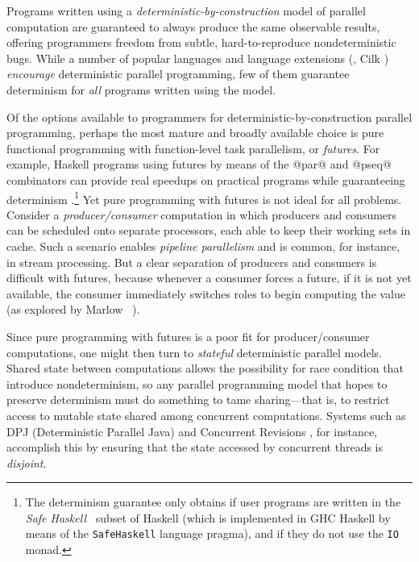 Programs written using a \emph{deterministic-by-construction} model of
parallel computation are guaranteed to always produce the same
observable results, offering programmers freedom from subtle,
hard-to-reproduce nondeterministic bugs.  While a number of popular
languages and language extensions (\eg, Cilk \cite{cilk}) \emph{encourage} deterministic parallel programming, few
of them guarantee determinism for \emph{all} programs written using
the model.

Of the options available to programmers for
deterministic-by-construction parallel programming, perhaps the most
mature and broadly available choice is pure functional programming
with function-level task parallelism, or \emph{futures}.  For example,
Haskell programs using futures by means of the @par@ and @pseq@
combinators can provide real speedups on practical programs while
guaranteeing determinism \cite{marlow-par}.\footnote{The determinism
  guarantee only obtains if user programs are written in the
  \emph{Safe Haskell}~\cite{safe-haskell} subset of Haskell (which is
  implemented in GHC Haskell by means of the \lstinline|SafeHaskell|
  language pragma), and if they do not use the \lstinline|IO| monad.}
Yet pure programming with futures is not ideal for all problems.
Consider a \emph{producer/consumer} computation in which producers and
consumers can be scheduled onto separate processors, each able to keep
their working sets in cache.  Such a scenario enables \emph{pipeline
  parallelism} and is common, for instance, in stream processing.  But
a clear separation of producers and consumers is difficult with
futures, because whenever a consumer forces a future, if it is not yet
available, the consumer immediately switches roles to begin computing
the value (as explored by Marlow \etal~\cite{monad-par}).

Since pure programming with futures is a poor fit for
producer/consumer computations, one might then turn to
{\em stateful} deterministic parallel models.  Shared state between
computations allows the possibility for race condition that introduce
nondeterminism, so any parallel programming model that hopes to preserve
determinism must do something to tame sharing---that is, to restrict
access to mutable state shared among concurrent computations.  Systems
such as DPJ (Deterministic Parallel Java) \cite{dpj-hotpar09} and
Concurrent Revisions
\cite{concurrent-revisions-oopsla,concurrent-revisions-haskell11}, for
instance, accomplish this by ensuring that the state accessed by
 concurrent threads is {\em
    disjoint}.

